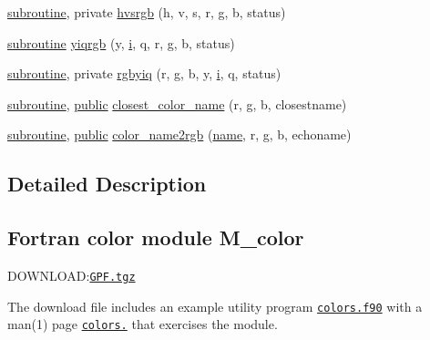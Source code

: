 \begin{DoxyCompactItemize}
\item 
\hyperlink{M__stopwatch_83_8txt_acfbcff50169d691ff02d4a123ed70482}{subroutine}, private \hyperlink{namespacem__color_a334ec90d94bbfb9a4c08c5f9efdb8c47}{hvsrgb} (h, v, s, r, g, b, status)
\item 
\hyperlink{M__stopwatch_83_8txt_acfbcff50169d691ff02d4a123ed70482}{subroutine} \hyperlink{namespacem__color_ac9cd845fb9975144a6deb3a21ce29a29}{yiqrgb} (y, \hyperlink{intro__blas1_83_8txt_a8ba82a50c0c2c12d5f6a77f7e4651c0b}{i}, q, r, g, b, status)
\item 
\hyperlink{M__stopwatch_83_8txt_acfbcff50169d691ff02d4a123ed70482}{subroutine}, private \hyperlink{namespacem__color_a386d004a1392b7e01ff66f1676d43def}{rgbyiq} (r, g, b, y, \hyperlink{intro__blas1_83_8txt_a8ba82a50c0c2c12d5f6a77f7e4651c0b}{i}, q, status)
\item 
\hyperlink{M__stopwatch_83_8txt_acfbcff50169d691ff02d4a123ed70482}{subroutine}, \hyperlink{M__stopwatch_83_8txt_a2f74811300c361e53b430611a7d1769f}{public} \hyperlink{namespacem__color_acad72628ee0b77cf87f40cd46734fb18}{closest\+\_\+color\+\_\+name} (r, g, b, closestname)
\item 
\hyperlink{M__stopwatch_83_8txt_acfbcff50169d691ff02d4a123ed70482}{subroutine}, \hyperlink{M__stopwatch_83_8txt_a2f74811300c361e53b430611a7d1769f}{public} \hyperlink{namespacem__color_a84a36043d278bc56a7148483a862dec8}{color\+\_\+name2rgb} (\hyperlink{M__stopwatch_83_8txt_a3f508a893ae4c3b397b4383e33b9bcae}{name}, r, g, b, echoname)
\end{DoxyCompactItemize}


\subsection{Detailed Description}
\subsection*{Fortran color module M\+\_\+color}

D\+O\+W\+N\+L\+O\+AD\+:\href{download.html}{\tt G\+P\+F.\+tgz} 

The download file includes an example utility program \href{../PROGRAMS/colors.f90}{\tt colors.\+f90} with a man(1) page \href{colors.1.html}{\tt colors.} that exercises the module. 


